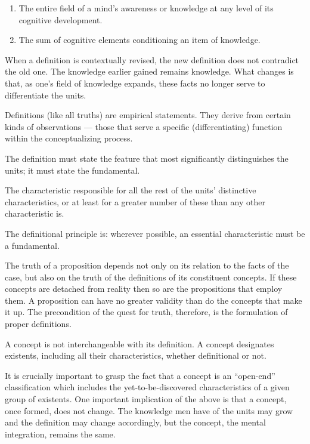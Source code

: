             \begin{definition}[Context]
            \label{def:context}
                \begin{enumerate}
                    \item The entire field of a mind's awareness or knowledge at any level of its cognitive development.
                    \item The sum of cognitive elements conditioning an item of knowledge.
                \end{enumerate}
            \end{definition}

        When a definition is contextually revised, the new definition does not contradict the old one. The knowledge earlier gained remains knowledge. What changes is that, as one's field of knowledge expands, these facts no longer serve to differentiate the units.

        Definitions (like all truths) are  empirical statements. They derive from certain kinds of observations — those that serve a specific (differentiating) function within the conceptualizing process.

        The definition must state the feature that most significantly distinguishes the units; it must state the fundamental. 

            \begin{definition}[Fundamental]
            \label{def:fundamental}
                The characteristic responsible for all the rest of the units' distinctive characteristics, or at least for a greater number of these than any other characteristic is.
            \end{definition}

        The definitional principle is: wherever possible, an essential characteristic must be a fundamental.

        The truth of a proposition depends not only on its relation to the facts of the case, but also on the truth of the definitions of its constituent concepts. If these concepts are detached from reality then so are the propositions that employ them. A proposition can have no greater validity than do the concepts that make it up. The precondition of the quest for truth, therefore, is the formulation of proper definitions.

        A concept is not interchangeable with its definition. A concept designates existents, including all their characteristics, whether definitional or not.

        It is crucially important to grasp the fact that a concept is an ``open-end'' classification which includes the yet-to-be-discovered characteristics of a given group of existents. One important implication of the above is that a concept, once formed, does not change. The knowledge men have of the units may grow and the definition may change accordingly, but the concept, the mental integration, remains the same. 






